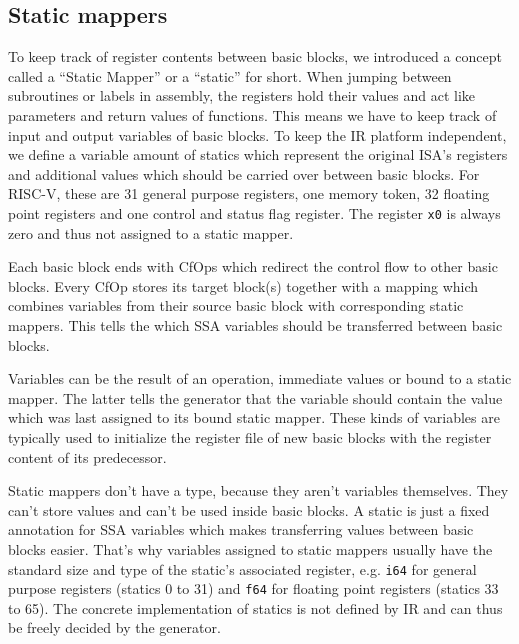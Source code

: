 \documentclass[course=eragp]{aspdoc}
\begin{document}
\subsection{Static mappers}\label{statics}

To keep track of register contents between basic blocks, we introduced a concept called a
``Static Mapper'' or a ``static'' for short. When jumping between subroutines or labels in assembly,
the registers hold their values and act like parameters and return values of functions. This means
we have to keep track of input and output variables of basic blocks. To keep the IR platform
independent, we define a variable amount of statics which represent the original ISA's registers and
additional values which should be carried over between basic blocks.
For RISC-V, these are 31 general purpose registers, one memory token, 32 floating point registers
and one control and status flag register. The register \texttt{x0} is always zero and thus not
assigned to a static mapper.

\par

Each basic block ends with CfOps which redirect the control flow to other basic blocks. Every CfOp
stores its target block(s) together with a mapping which combines variables from their source basic
block with corresponding static mappers. This tells the  which SSA variables
should be transferred between basic blocks.

\par

Variables can be the result of an operation, immediate values or bound to a static mapper. The
latter tells the generator that the variable should contain the value which was last assigned to
its bound static mapper. These kinds of variables are typically used to initialize the register file
of new basic blocks with the register content of its predecessor.

\par

Static mappers don't have a type, because they aren't variables themselves. They can't store values
and can't be used inside basic blocks. A static is just a fixed annotation for SSA variables which
makes transferring values between basic blocks easier. That's why variables assigned to static
mappers usually have the standard size and type of the static's associated register, e.g. \texttt{i64} for
general purpose registers (statics 0 to 31) and \texttt{f64} for floating point registers (statics 33
to 65). The concrete implementation of statics is not defined by IR and can thus be freely
decided by the generator.
\end{document}
